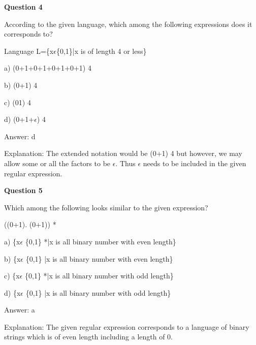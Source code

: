 \documentclass{article}
\begin{document}
\begin{mdframed}[linewidth=1pt, roundcorner=5pt, linecolor=gray!30, backgroundcolor=gray!5]
\textbf{Question 4} 

According to the given language, which among the following expressions does it corresponds to?

Language L=\{x$\epsilon$\{0,1\}|x is of length 4 or less\}

a) (0+1+0+1+0+1+0+1)
4

b) (0+1)
4

c) (01)
4

d) (0+1+$\epsilon$)
4
\vspace{5pt} \par
\begin{tcolorbox}[colback=green!5, colframe=green!40!black, title=Solution]
Answer: d

Explanation: The extended notation would be (0+1)
4
 but however, we may allow some or all the factors to be $\epsilon$. Thus $\epsilon$ needs to be included in the given regular expression.
\end{tcolorbox}
\end{mdframed}

\begin{mdframed}[linewidth=1pt, roundcorner=5pt, linecolor=gray!30, backgroundcolor=gray!5]
\textbf{Question 5} 

Which among the following looks similar to the given expression?

       ((0+1). (0+1)) *

a) \{x$\epsilon$ \{0,1\} *|x is all binary number with even length\}

b) \{x$\epsilon$ \{0,1\} |x is all binary number with even length\}

c) \{x$\epsilon$ \{0,1\} *|x is all binary number with odd length\}

d) \{x$\epsilon$ \{0,1\} |x is all binary number with odd length\}
\vspace{5pt} \par
\begin{tcolorbox}[colback=green!5, colframe=green!40!black, title=Solution]
Answer: a

Explanation: The given regular expression corresponds to a language of binary strings which is of even length including a length of 0.
\end{tcolorbox}
\end{mdframed}
\end{document}

